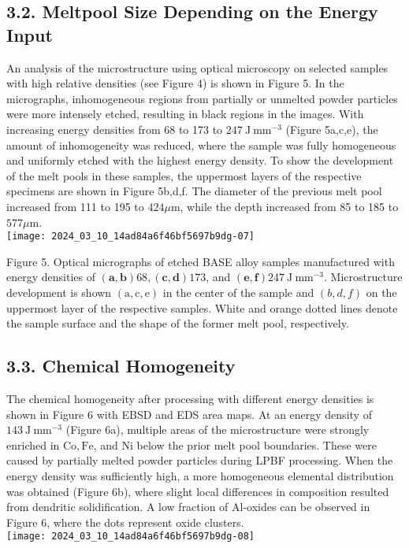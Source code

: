 \documentclass[10pt]{article}
\begin{document}
\subsection*{3.2. Meltpool Size Depending on the Energy Input}
An analysis of the microstructure using optical microscopy on selected samples with high relative densities (see Figure 4) is shown in Figure 5. In the micrographs, inhomogeneous regions from partially or unmelted powder particles were more intensely etched, resulting in black regions in the images. With increasing energy densities from 68 to 173 to $247 \mathrm{~J} \mathrm{~mm}^{-3}$ (Figure 5a,c,e), the amount of inhomogeneity was reduced, where the sample was fully homogeneous and uniformly etched with the highest energy density. To show the development of the melt pools in these samples, the uppermost layers of the respective specimens are shown in Figure 5b,d,f. The diameter of the previous melt pool increased from 111 to 195 to $424 \mu \mathrm{m}$, while the depth increased from 85 to 185 to $577 \mu \mathrm{m}$.\\
\texttt{[image: 2024\_03\_10\_14ad84a6f46bf5697b9dg-07]}

Figure 5. Optical micrographs of etched BASE alloy samples manufactured with energy densities of $(\mathbf{a}, \mathbf{b}) 68,(\mathbf{c}, \mathbf{d}) 173$, and $(\mathbf{e}, \mathbf{f}) 247 \mathrm{~J} \mathrm{~mm}^{-3}$. Microstructure development is shown $(\mathrm{a}, \mathrm{c}, \mathrm{e})$ in the center of the sample and $(b, d, f)$ on the uppermost layer of the respective samples. White and orange dotted lines denote the sample surface and the shape of the former melt pool, respectively.

\subsection*{3.3. Chemical Homogeneity}
The chemical homogeneity after processing with different energy densities is shown in Figure 6 with EBSD and EDS area maps. At an energy density of $143 \mathrm{~J} \mathrm{~mm}^{-3}$ (Figure 6a), multiple areas of the microstructure were strongly enriched in $\mathrm{Co}, \mathrm{Fe}$, and $\mathrm{Ni}$ below the prior melt pool boundaries. These were caused by partially melted powder particles during LPBF processing. When the energy density was sufficiently high, a more homogeneous elemental distribution was obtained (Figure 6b), where slight local differences in composition resulted from dendritic solidification. A low fraction of Al-oxides can be observed in Figure 6, where the dots represent oxide clusters.\\
\texttt{[image: 2024\_03\_10\_14ad84a6f46bf5697b9dg-08]}
\end{document}

